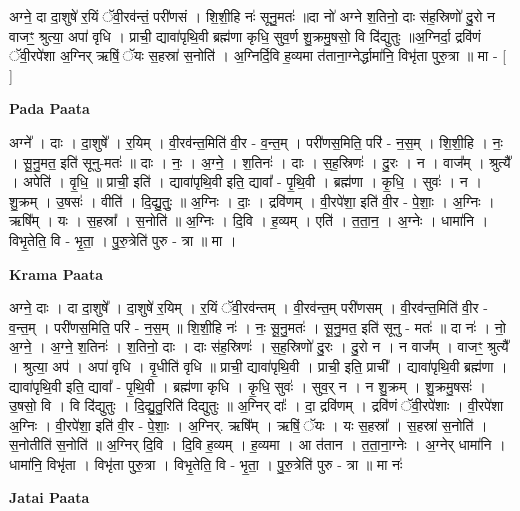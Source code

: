 \documentclass[17pt]{extarticle}
\begin{document}
अग्ने॒ दा दा॒शुषे॑ र॒यिं ॅवी॒रव॑न्तं॒ परी॑णसं । शि॒शी॒हि नः॑ सूनु॒मतः॑ ॥दा नो॑ अग्ने श॒तिनो॒ दाः स॑ह॒स्रिणो॑ दु॒रो न वाजꣳ॒॒ श्रुत्या॒ अपा॑ वृधि । प्राची॒ द्यावा॑पृथि॒वी ब्रह्म॑णा कृधि॒ सुव॒र्ण शु॒क्रमु॒षसो॒ वि दि॑द्युतुः ॥अ॒ग्निर्दा॒ द्रवि॑णं ॅवी॒रपे॑शा अ॒ग्निर् ऋषिं॒ ॅयः स॒हस्रा॑ स॒नोति॑ । अ॒ग्निर्दि॒वि ह॒व्यमा त॑ताना॒ग्नेर्द्धामा॑नि॒ विभृ॑ता पुरु॒त्रा ॥ मा - [  ] \newline

\textbf{Pada Paata} \newline

अग्ने᳚ । दाः । दा॒शुषे᳚ । र॒यिम् । वी॒रव॑न्त॒मिति॑ वी॒र - व॒न्त॒म् । परी॑णस॒मिति॒ परि॑ - न॒स॒म् । शि॒शी॒हि । नः॒ । सू॒नु॒मत॒ इति॑ सूनु-मतः॑ ॥ दाः । नः॒ । अ॒ग्ने॒ । श॒तिनः॑ । दाः । स॒ह॒स्रिणः॑ । दु॒रः । न । वाज᳚म् । श्रुत्यै᳚ । अपेति॑ । वृ॒धि॒ ॥ प्राची॒ इति॑ । द्यावा॑पृथि॒वी इति॒ द्यावा᳚ - पृ॒थि॒वी । ब्रह्म॑णा । कृ॒धि॒ । सुवः॑ । न । शु॒क्रम् । उ॒षसः॑ । वीति॑ । दि॒द्यु॒तुः॒ ॥ अ॒ग्निः । दाः॒ । द्रवि॑णम् । वी॒रपे॑शा॒ इति॑ वी॒र - पे॒शाः॒ । अ॒ग्निः । ऋषि᳚म् । यः । स॒हस्रा᳚ । स॒नोति॑ ॥ अ॒ग्निः । दि॒वि । ह॒व्यम् । एति॑ । त॒ता॒न॒ । अ॒ग्नेः । धामा॑नि । विभृ॒तेति॒ वि - भृ॒ता॒ । पु॒रु॒त्रेति॑ पुरु - त्रा ॥ मा ।  \newline


\textbf{Krama Paata} \newline

अग्ने॒ दाः । दा दा॒शुषे᳚ । दा॒शुषे॑ र॒यिम् । र॒यिं ॅवी॒रव॑न्तम् । वी॒रव॑न्त॒म् परी॑णसम् । वी॒रव॑न्त॒मिति॑ वी॒र - व॒न्त॒म् । परी॑णस॒मिति॒ परि॑ - न॒स॒म् ॥ शि॒शी॒हि नः॑ । नः॒ सू॒नु॒मतः॑ । सू॒नु॒मत॒ इति॑ सूनु - मतः॑ ॥ दा नः॑ । नो॒ अ॒ग्ने॒ । अ॒ग्ने॒ श॒तिनः॑ । श॒तिनो॒ दाः । दाः स॑ह॒स्रिणः॑ । स॒ह॒स्रिणो॑ दु॒रः । दु॒रो न । न वाज᳚म् । वाजꣳ॒॒ श्रुत्यै᳚ । श्रुत्या॒ अप॑ । अपा॑ वृधि । वृ॒धीति॑ वृधि ॥ प्राची॒ द्यावा॑पृथि॒वी । प्राची॒ इति॒ प्राची᳚ । द्यावा॑पृथि॒वी ब्रह्म॑णा । द्यावा॑पृथि॒वी इति॒ द्यावा᳚ - पृ॒थि॒वी । ब्रह्म॑णा कृधि । कृ॒धि॒ सुवः॑ । सुव॒र् न । न शु॒क्रम् । शु॒क्रमु॒षसः॑ । उ॒षसो॒ वि । वि दि॑द्युतुः । दि॒द्यु॒तु॒रिति॑ दिद्युतुः ॥ अ॒ग्निर् दाः᳚ । दा॒ द्रवि॑णम् । द्रवि॑णं ॅवी॒रपे॑शाः । वी॒रपे॑शा अ॒ग्निः । वी॒रपे॑शा॒ इति॑ वी॒र - पे॒शाः॒ । अ॒ग्निर्. ऋषि᳚म् । ऋषिं॒ ॅयः । यः स॒हस्रा᳚ । स॒हस्रा॑ स॒नोति॑ । स॒नोतीति॑ स॒नोति॑ ॥ अ॒ग्निर् दि॒वि । दि॒वि ह॒व्यम् । ह॒व्यमा । आ त॑तान । त॒ता॒ना॒ग्नेः । अ॒ग्नेर् धामा॑नि । धामा॑नि॒ विभृ॑ता । विभृ॑ता पुरु॒त्रा । विभृ॒तेति॒ वि - भृ॒ता॒ । पु॒रु॒त्रेति॑ पुरु - त्रा ॥ मा नः॑ \newline

\textbf{Jatai Paata} \newline
\end{document}
